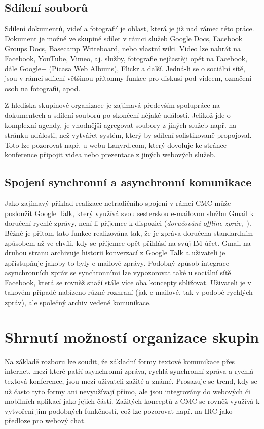 \documentclass[12pt,oneside,final]{fithesis2}
\begin{document}
\subsection{Sdílení souborů}
Sdílení dokumentů, videí a fotografií je oblast, která je již nad rámec této práce. Dokument je možné ve skupině sdílet v rámci služeb Google Docs, Facebook Groups Docs, Basecamp Writeboard, nebo vlastní wiki. Video lze nahrát na Facebook, YouTube, Vimeo, aj. služby, fotografie nejčastěji opět na Facebook, dále Google+ (Picasa Web Albums), Flickr a další. Jedná-li se o sociální sítě, jsou v rámci sdílení většinou přítomny funkce pro diskusi pod videem, označení osob na fotografii, apod.

Z hlediska skupinové organizace je zajímavá především spolupráce na dokumentech a sdílení souborů po skončení nějaké události. Jelikož jde o komplexní agendy, je vhodnější agregovat soubory z jiných služeb např. na stránku události, než vytvářet systém, který by sdílení sofistikovaně propojoval. Toto lze pozorovat např. u webu Lanyrd.com, který dovoluje ke stránce konference připojit videa nebo prezentace z jiných webových služeb.

\subsection{Spojení synchronní a asynchronní komunikace}\label{syncAsync}
Jako zajímavý příklad realizace netradičního spojení v rámci CMC může posloužit Google Talk, který využívá svou sesterskou e-mailovou službu Gmail k doručení rychlé zprávy, není-li příjemce k dispozici (\emph{doručování offline zpráv},~\cite{lindberg2006offline}). Běžně je přitom tato funkce realizována tak, že je zpráva doručena standardním způsobem až ve chvíli, kdy se příjemce opět přihlásí na svůj IM účet. Gmail na druhou stranu archivuje historii konverzací z Google Talk a uživateli je zpřístupňuje jakoby to byly e-mailové zprávy. Podobný způsob integrace asynchronních zpráv se synchronními lze vypozorovat také u sociální sítě Facebook, která se rovněž snaží stále více oba koncepty sbližovat. Uživateli je v takovém případě nabízeno různé rozhraní (jak e-mailové, tak v podobě rychlých zpráv), ale společný archiv vedené komunikace.


\section{Shrnutí možností organizace skupin}\label{optionsConclusion}
Na základě rozboru lze soudit, že základní formy textové komunikace přes internet, mezi které patří asynchronní zpráva, rychlá synchronní zpráva a rychlá textová konference, jsou mezi uživateli zažité a známé. Prosazuje se trend, kdy se už často tyto formy ani nevyužívají přímo, ale jsou integrovány do webových či mobilních aplikací jako jejich části. Zažitých konceptů z CMC se rovněž využívá k vytvoření jim podobných funkčností, což lze pozorovat např. na IRC jako předloze pro webový chat.
\end{document}
